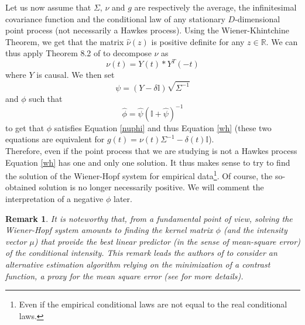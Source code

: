 \documentclass[a4paper,11pt]{article}
\newtheorem{remark}{Remark}[section]
\newcommand{\I}{\mathbb{I}}
\begin{document}
\noindent Let us now assume that $\Sigma$, $\nu$ and $g$ are respectively the average, the infinitesimal covariance function and the conditional law of any stationary $D$-dimensional point process (not necessarily a Hawkes process). Using the Wiener-Khintchine Theorem, we get that the matrix $\widehat{\nu}(z)$ is positive definite for any $z\in \mathbb{R}$. We can thus apply Theorem 8.2 of \cite{gokhberg1958systems} to decompose $\nu$ as $$\nu(t)=Y(t)\ast Y^T(-t)$$
where $Y$ is causal. We then set $$\psi=(Y-\delta \mathbb{I})\sqrt{\Sigma^{-1}}$$
and $\phi$ such that
$$\hat{\phi}=\hat{\psi}(\mathbb{I}+\hat{\psi})^{-1}$$
to get that $\phi$ satisfies Equation \eqref{nuphi} and thus Equation \eqref{wh} (these two equations are equivalent for $g(t) = \nu(t) \Sigma^{-1} -\delta(t)\I$).\\

\noindent Therefore, even if the point process that we are studying is not a Hawkes process Equation \eqref{wh} has one and only one solution. It thus makes sense to try to find the solution of the Wiener-Hopf system for empirical data\footnote{Even if the empirical conditional laws are not equal to the real conditional laws.}.
Of course, the so-obtained solution is no longer necessarily positive. We will comment the interpretation of a negative $\phi$ later.

\begin{remark}
It is noteworthy that, from a fundamental point of view, solving the Wiener-Hopf system amounts to finding the kernel matrix $\phi$ 
(and the intensity vector $\mu$) that provide the best linear predictor (in the sense of mean-square error) 
of the conditional intensity. This remark leads the authors of \cite{hansen2012lasso,reynaud2014goodness} to consider an alternative estimation algorithm relying on the minimization
of a contrast function, a proxy for the mean square error (see \cite{bacry2014second} for more details). 
\end{remark}
\end{document}
